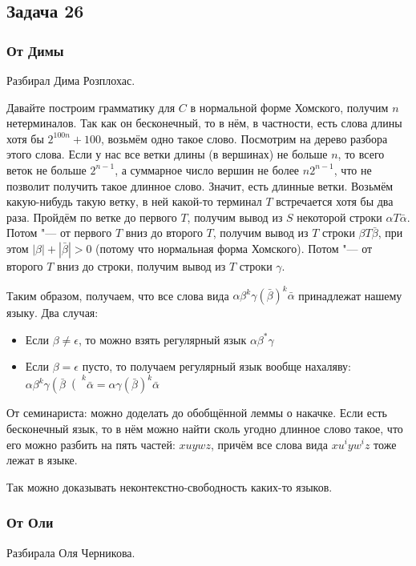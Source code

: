 \subsection{Задача 26}
	\subsubsection{От Димы}
		Разбирал Дима Розплохас.

		Давайте построим грамматику для $C$ в нормальной форме Хомского, получим $n$ нетерминалов.
		Так как он бесконечный, то в нём, в частности, есть слова длины хотя бы $2^{100n}+100$, возьмём одно такое слово.
		Посмотрим на дерево разбора этого слова.
		Если у нас все ветки длины (в вершинах) не больше $n$, то всего веток не больше $2^{n-1}$, а
		суммарное число вершин не более $n2^{n-1}$, что не позволит получить такое длинное слово.
		Значит, есть длинные ветки.
		Возьмём какую-нибудь такую ветку, в ней какой-то терминал $T$ встречается хотя бы два раза.
		Пройдём по ветке до первого $T$, получим вывод из $S$ некоторой строки $\alpha T \bar\alpha$.
		Потом "--- от первого $T$ вниз до второго $T$, получим вывод из $T$ строки $\beta T \bar\beta$,
		при этом $|\beta| + |\bar\beta| > 0$ (потому что нормальная форма Хомского).
		Потом "--- от второго $T$ вниз до строки, получим вывод из $T$ строки $\gamma$.

		Таким образом, получаем, что все слова вида $\alpha \beta^k \gamma \left(\bar\beta\right)^k \bar\alpha$ принадлежат нашему языку.
		Два случая:
		\begin{itemize}
			\item Если $\beta \neq \epsilon$, то можно взять регулярный язык $\alpha\beta^*\gamma$
			\item Если $\beta = \epsilon$ пусто, то получаем регулярный язык вообще нахаляву: $\alpha \beta^k \gamma \left(\bar\beta\right(^k \bar\alpha = \alpha \gamma \left(\bar\beta\right)^k \bar \alpha$
		\end{itemize}

		\begin{Rem}
			От семинариста: можно доделать до обобщённой леммы о накачке.
			Если есть бесконечный язык, то в нём можно найти сколь угодно длинное слово такое,
			что его можно разбить на пять частей: $xuywz$, причём все слова вида
			$xu^iyw^iz$ тоже лежат в языке.

			Так можно доказывать неконтекстно-свободность каких-то языков.
		\end{Rem}

	\subsubsection{От Оли}
		Разбирала Оля Черникова.

